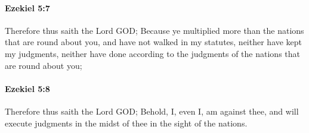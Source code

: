 		\paragraph{Ezekiel 5:7} %
			\label{EZEKIEL-5-7}

			Therefore thus saith the Lord GOD; Because ye multiplied more than the nations that are round about you, and have not walked in my statutes, neither have kept my judgments, neither have done according to the judgments of the nations that are round about you;


		\paragraph{Ezekiel 5:8} %
			\label{EZEKIEL-5-8}

			Therefore thus saith the Lord GOD; Behold, I, even I, am against thee, and will execute judgments in the midst of thee in the sight of the nations.


